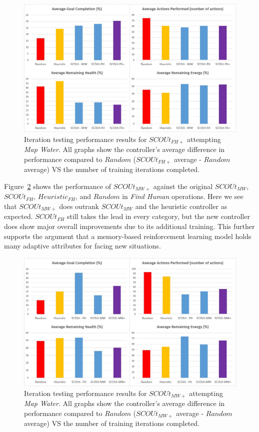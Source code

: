 \begin{figure}[H]
  \includegraphics[width=1.0\columnwidth]{Figures/Results/Experiment2/AdditionalTraining/FindHumanPlus.JPG}
  \caption{Iteration testing performance results for $SCOUt_{FH+}$ attempting \textit{Map Water}. All graphs show the controller's average difference in performance compared to $Random$ ($SCOUt_{FH+}$ average - $Random$ average) VS the number of training iterations completed.}
  \label{fig:findhumanplus_test_results}
\end{figure}


Figure~\ref{fig:mapwaterplus_test_results} shows the performance of $SCOUt_{MW+}$ against the original $SCOUt_{MW}$, $SCOUt_{FH}$, $Heuristic_{FH}$, and $Random$ in \textit{Find Human} operations.
Here we see that $SCOUt_{MW+}$ does outrank $SCOUt_{MW}$ and the heuristic controller as expected.
$SCOUt_{FH}$ still takes the lead in every category, but the new controller does show major overall improvements due to its additional training.
This further supports the argument that a memory-based reinforcement learning model holds many adaptive attributes for facing new situations.


\begin{figure}[H]
  \includegraphics[width=1.0\columnwidth]{Figures/Results/Experiment2/AdditionalTraining/MapWaterPlus.JPG}
  \caption{Iteration testing performance results for $SCOUt_{MW+}$ attempting \textit{Map Water}. All graphs show the controller's average difference in performance compared to $Random$ ($SCOUt_{MW+}$ average - $Random$ average) VS the number of training iterations completed.}
  \label{fig:mapwaterplus_test_results}
\end{figure}



